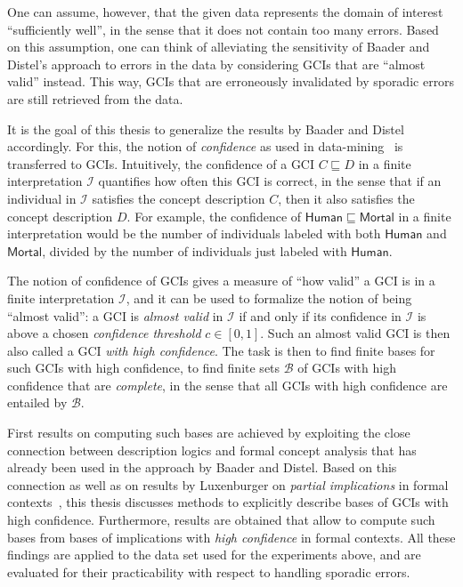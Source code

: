 \documentclass[english,fleqn]{scrartcl}
\begin{document}
One can assume, however, that the given data represents the domain of interest
\enquote{sufficiently well}, in the sense that it does not contain too many errors.  Based
on this assumption, one can think of alleviating the sensitivity of Baader and Distel's
approach to errors in the data by considering GCIs that are \enquote{almost valid}
instead.  This way, GCIs that are erroneously invalidated by sporadic errors are still
retrieved from the data.

It is the goal of this thesis to generalize the results by Baader and Distel accordingly.
For this, the notion of \emph{confidence} as used in
data-mining~\cite{arules:agrawal:association-rules} is transferred to GCIs.  Intuitively,
the confidence of a GCI $C \sqsubseteq D$ in a finite interpretation $\mathcal{I}$
quantifies how often this GCI is correct, in the sense that if an individual in
$\mathcal{I}$ satisfies the concept description $C$, then it also satisfies the concept
description $D$.  For example, the confidence of $\mathsf{Human} \sqsubseteq
\mathsf{Mortal}$ in a finite interpretation would be the number of individuals labeled
with both $\mathsf{Human}$ and $\mathsf{Mortal}$, divided by the number of individuals
just labeled with $\mathsf{Human}$.

The notion of confidence of GCIs gives a measure of \enquote{how valid} a GCI is in a
finite interpretation $\mathcal{I}$, and it can be used to formalize the notion of being
\enquote{almost valid}: a GCI is \emph{almost valid} in $\mathcal{I}$ if and only if its
confidence in $\mathcal{I}$ is above a chosen \emph{confidence threshold} $c \in [0,1]$.
Such an almost valid GCI is then also called a GCI \emph{with high confidence}.  The task
is then to find finite bases for such GCIs with high confidence, \ie to find finite sets
$\mathcal{B}$ of GCIs with high confidence that are \emph{complete}, in the sense that all
GCIs with high confidence are entailed by $\mathcal{B}$.

First results on computing such bases are achieved by exploiting the close connection
between description logics and formal concept analysis that has already been used in the
approach by Baader and Distel.  Based on this connection as well as on results by
Luxenburger on \emph{partial implications} in formal contexts~\cite{diss:Luxenburger},
this thesis discusses methods to explicitly describe bases of GCIs with high confidence.
Furthermore, results are obtained that allow to compute such bases from bases of
implications with \emph{high confidence} in formal contexts.  All these findings are
applied to the data set used for the experiments above, and are evaluated for their
practicability with respect to handling sporadic errors.
\end{document}
